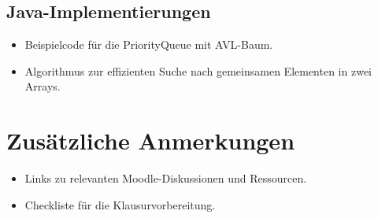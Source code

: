 \documentclass[a4paper,12pt]{article}
\begin{document}
\subsection{Java-Implementierungen}
\begin{itemize}
    \item Beispielcode für die PriorityQueue mit AVL-Baum.
    \item Algorithmus zur effizienten Suche nach gemeinsamen Elementen in zwei Arrays.
\end{itemize}

\section{Zusätzliche Anmerkungen}
\begin{itemize}
    \item Links zu relevanten Moodle-Diskussionen und Ressourcen.
    \item Checkliste für die Klausurvorbereitung.
\end{itemize}
\end{document}
